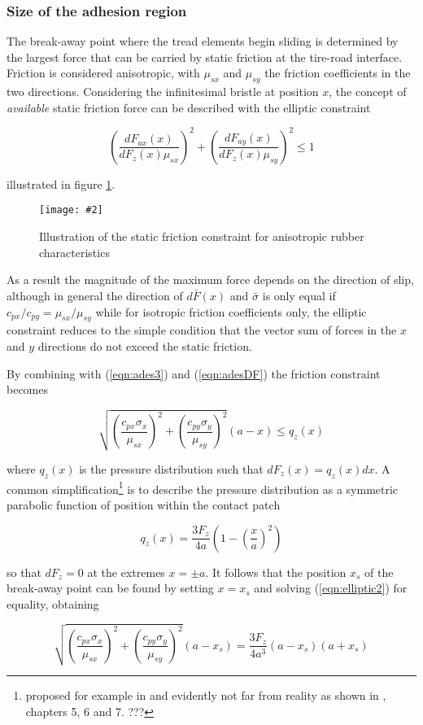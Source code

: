 \documentclass[12pt,a4paper]{report}
\newcommand{\figura}[5][htbp]{
\begin{figure}[#1]
\begin{center}
\texttt{[image: \#2]}
\caption{#4}\label{#5}
\end{center}
\end{figure}
}
\newcommand{\eq}[2]{
\begin{equation} \label{#1}
#2
\end{equation}
}
\newcommand{\req}[1]{
(\ref{#1})
}
\begin{document}
\subsubsection*{Size of the adhesion region}
The break-away point where the tread elements begin sliding is determined by the largest force that can be carried by static friction at the tire-road interface.
Friction is considered anisotropic, with $\mu_{sx}$ and $\mu_{sy}$ the friction coefficients in the two directions. %
Considering the infinitesimal bristle at position $x$, the concept of \emph{available} static friction force can be described with the elliptic constraint

\eq{eqn:elliptic}{\left(\frac{dF_{ax}(x)}{dF_z(x) \mu_{sx}}\right)^2 + \left(\frac{dF_{ay}(x)}{dF_z(x) \mu_{sy}}\right)^2 \leqslant 1}

illustrated in figure \ref{fig:elliptic}.
\figura{pix/fric_ellipse.jpg}{width=8cm}{Illustration of the static friction constraint for anisotropic rubber characteristics}{fig:elliptic}

As a result the magnitude of the maximum force depends on the direction of slip, although in general the direction of $d\bar{F}(x)$ and $\bar{\sigma}$ is only equal if $c_{px}/c_{py}=\mu_{sx}/\mu_{sy}$ while for isotropic friction coefficients only, the elliptic constraint reduces to the simple condition that the vector sum of forces in the $x$ and $y$ directions do not exceed the static friction.

By combining with \req{eqn:ades3} and \req{eqn:adesDF} the friction constraint becomes

\eq{eqn:elliptic2}{\sqrt{\left(\frac{c_{px} \sigma_x}{\mu_{sx}}\right)^2 + \left(\frac{c_{py} \sigma_y}{\mu_{sy}}\right)^2}(a-x) \leqslant q_z(x)}

where $q_z(x)$ is the pressure distribution such that $dF_z(x)=q_z(x)dx$. A common simplification\footnote{proposed for example in \citep{compare74} and evidently not far from reality as shown in \citep{nhtsa}, chapters 5, 6 and 7. ???} is to describe the pressure distribution as a symmetric parabolic function of position within the contact patch
\eq{eqn:presdist}{q_z(x)=\frac{3F_z}{4a}(1-(\frac{x}{a})^2)}
so that $dF_z = 0$ at the extremes $x=\pm a$.
It follows that the position $x_s$ of the break-away point can be found by setting $x=x_s$ and solving \req{eqn:elliptic2} for equality, obtaining

\eq{eqn:elliptic3}{\sqrt{\left(\frac{c_{px} \sigma_x}{\mu_{sx}}\right)^2 + \left(\frac{c_{py} \sigma_y}{\mu_{sy}}\right)^2}(a-x_s) = \frac{3F_z}{4a^3}(a-x_s)(a+x_s)}
\end{document}
